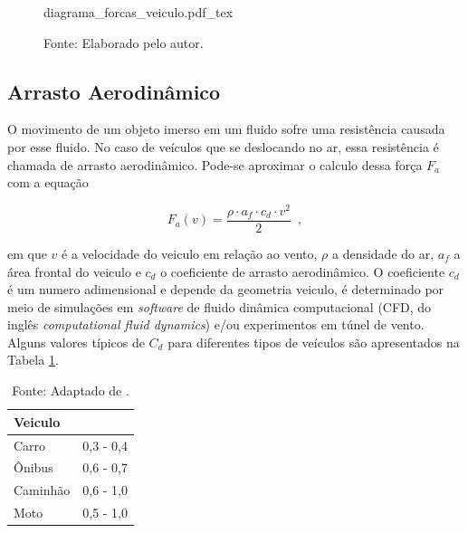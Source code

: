\begin{figure}[H]
	\centering
	\caption{Diagrama de forças de um veículo em movimento}
	\label{fig:diag_forcas_veiculo}
	\begin{normalsize}
		{diagrama_forcas_veiculo.pdf_tex}
	\end{normalsize}
	\caption*{\footnotesize Fonte: Elaborado pelo autor.}
\end{figure}

\subsection{Arrasto Aerodinâmico}
\label{subsec:arrasto_aerodinamico}

O movimento de um objeto imerso em um fluido sofre uma resistência causada por esse fluido. No
caso de veículos que se deslocando no ar, essa
resistência é chamada de arrasto aerodinâmico.
Pode-se aproximar o calculo dessa força $F_{a}$ com a equação

\begin{equation}
	\label{eq:Fa}
	F_a(v) = \frac{\rho \cdot a_f \cdot c_d \cdot v^2}{2}
	\enspace,
\end{equation}

em que $v$ é a velocidade do veiculo em relação ao vento, $\rho$ a densidade do ar, $a_{f}$ a área frontal do
veiculo e $c_{d}$ o coeficiente de arrasto aerodinâmico.
O coeficiente $c_{d}$ é um numero adimensional e depende da geometria veiculo, é determinado por meio de simulações em \textit{software} de fluido
dinâmica
computacional (CFD, do inglês \textit{computational fluid dynamics}) e/ou experimentos em túnel de vento\cite{book:guzzella2012vehicle}. Alguns
valores típicos de $C_{d}$ para diferentes tipos de
veículos são apresentados na Tabela \ref{tab:ComparacaoCD}.

\begin{table}[H]
	\centering
	\caption{Comparação do $c_{d}$ de diferentes tipos veículos}
	\begin{tabular}{ll}
		\toprule
		\textbf{Veiculo} & \boldsymbol{$c_{d}$} \\
		\hline
		Carro            & 0,3 - 0,4            \\
		Ônibus           & 0,6 - 0,7            \\
		Caminhão         & 0,6 - 1,0            \\
		Moto             & 0,5 - 1,0            \\
		\bottomrule
	\end{tabular}
	\caption*{\footnotesize Fonte: Adaptado de \citeauthor{book:GroundVehicleDynamics}.}
	\label{tab:ComparacaoCD}
\end{table}

